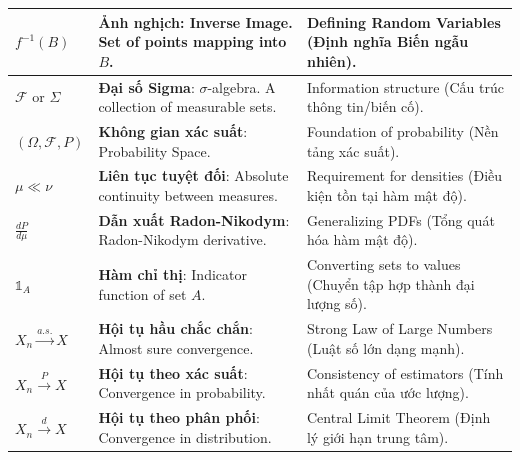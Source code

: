 \begin{longtable}{ | L{0.15\textwidth} | L{0.45\textwidth} | L{0.25\textwidth} | }
    $f^{-1}(B)$ 
    & \textbf{Ảnh nghịch}: Inverse Image. Set of points mapping into $B$. 
    & Defining Random Variables (Định nghĩa Biến ngẫu nhiên). \\ 
    \hline

    $\mathcal{F}$ or $\Sigma$
    & \textbf{Đại số Sigma}: $\sigma$-algebra. A collection of measurable sets. 
    & Information structure (Cấu trúc thông tin/biến cố). \\
    \hline

    $(\Omega, \mathcal{F}, P)$
    & \textbf{Không gian xác suất}: Probability Space. 
    & Foundation of probability (Nền tảng xác suất). \\
    \hline

    $\mu \ll \nu$
    & \textbf{Liên tục tuyệt đối}: Absolute continuity between measures. 
    & Requirement for densities (Điều kiện tồn tại hàm mật độ). \\
    \hline

    $\frac{dP}{d\mu}$
    & \textbf{Dẫn xuất Radon-Nikodym}: Radon-Nikodym derivative. 
    & Generalizing PDFs (Tổng quát hóa hàm mật độ). \\
    \hline

    $\mathbb{1}_A$
    & \textbf{Hàm chỉ thị}: Indicator function of set $A$. 
    & Converting sets to values (Chuyển tập hợp thành đại lượng số). \\
    \hline

    $X_n \xrightarrow{a.s.} X$
    & \textbf{Hội tụ hầu chắc chắn}: Almost sure convergence. 
    & Strong Law of Large Numbers (Luật số lớn dạng mạnh). \\
    \hline

    $X_n \xrightarrow{P} X$
    & \textbf{Hội tụ theo xác suất}: Convergence in probability. 
    & Consistency of estimators (Tính nhất quán của ước lượng). \\
    \hline

    $X_n \xrightarrow{d} X$
    & \textbf{Hội tụ theo phân phối}: Convergence in distribution. 
    & Central Limit Theorem (Định lý giới hạn trung tâm). \\
    \hline

\end{longtable}